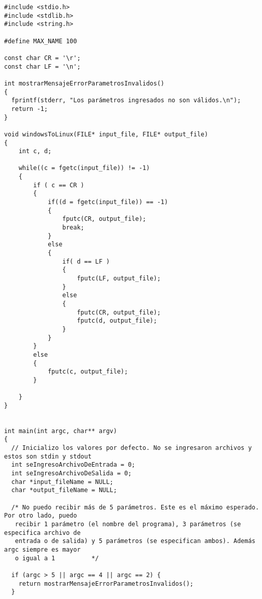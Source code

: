 \documentclass[a4paper,11pt]{article}
\begin{document}
\begin{verbatim}
#include <stdio.h>
#include <stdlib.h>
#include <string.h>

#define MAX_NAME 100

const char CR = '\r';
const char LF = '\n';

int mostrarMensajeErrorParametrosInvalidos()
{
  fprintf(stderr, "Los parámetros ingresados no son válidos.\n");
  return -1;
}

void windowsToLinux(FILE* input_file, FILE* output_file)
{
	int c, d;

	while((c = fgetc(input_file)) != -1)
	{
		if ( c == CR )
		{
      		if((d = fgetc(input_file)) == -1)
      		{
        		fputc(CR, output_file);
        		break;
      		}
      		else
      		{
        		if( d == LF )
        		{
          			fputc(LF, output_file);
        		}
		        else
		        {
		          	fputc(CR, output_file);
		          	fputc(d, output_file);
		        }
      		}
    	}
    	else
    	{
      		fputc(c, output_file);
    	}

	}
}


int main(int argc, char** argv)
{
  // Inicializo los valores por defecto. No se ingresaron archivos y estos son stdin y stdout
  int seIngresoArchivoDeEntrada = 0;
  int seIngresoArchivoDeSalida = 0;
  char *input_fileName = NULL;
  char *output_fileName = NULL;

  /* No puedo recibir más de 5 parámetros. Este es el máximo esperado. Por otro lado, puedo
   recibir 1 parámetro (el nombre del programa), 3 parámetros (se especifica archivo de
   entrada o de salida) y 5 parámetros (se especifican ambos). Además argc siempre es mayor
   o igual a 1          */

  if (argc > 5 || argc == 4 || argc == 2) {
    return mostrarMensajeErrorParametrosInvalidos();
  }


\end{verbatim}
\end{document}
